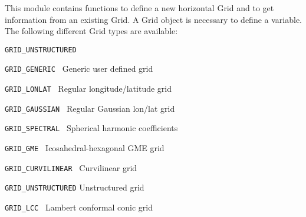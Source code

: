 This module contains functions to define a new horizontal Grid
and to get information from an existing Grid.
A Grid object is necessary to define a variable.
The following different Grid types are available:

\vspace*{3mm}
\hspace*{8mm}\begin{minipage}{15cm}
\begin{deflist}{{\large\tt GRID\_UNSTRUCTURED \ \ }}
\item[{\large\tt GRID\_GENERIC     }]  Generic user defined grid      
\item[{\large\tt GRID\_LONLAT      }]  Regular longitude/latitude grid
\item[{\large\tt GRID\_GAUSSIAN    }]  Regular Gaussian lon/lat grid
\item[{\large\tt GRID\_SPECTRAL    }]  Spherical harmonic coefficients
\item[{\large\tt GRID\_GME         }]  Icosahedral-hexagonal GME grid    
\item[{\large\tt GRID\_CURVILINEAR }]  Curvilinear grid
\item[{\large\tt GRID\_UNSTRUCTURED}]  Unstructured grid
\item[{\large\tt GRID\_LCC         }]  Lambert conformal conic grid
\end{deflist}
\end{minipage}
